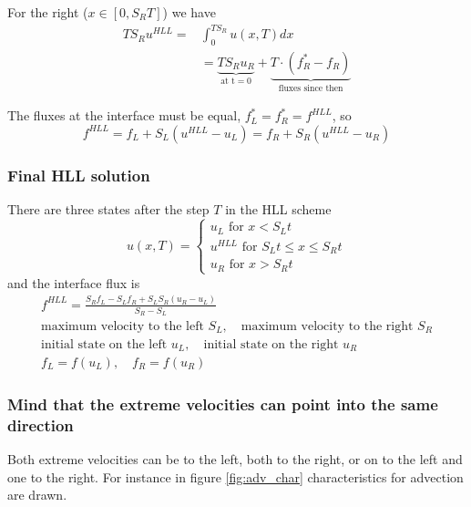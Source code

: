 For the right ($x \in [0, S_R T]$) we have
\begin{equation}
    \begin{aligned}
        T S_R u^{H L L}= & \int_{0}^{T S_R} u(x, T) d x \\
        & = \underbrace{T S_R u_R}_{\text{at t} = 0} + \underbrace{T \cdot\left(f_R^*-f_R\right)}_{\text{fluxes since then}}
    \end{aligned}
\end{equation}

The fluxes at the interface must be equal, $f_L^* = f_R^* = f^{HLL}$, so
\begin{equation}
    f^{H L L}=f_L+S_L\left(u^{H L L}-u_L\right)=f_R+S_R\left(u^{H L L}-u_R\right)
\end{equation}

\subsubsection{Final HLL solution}
There are three states after the step $T$ in the HLL scheme
\begin{equation}
    u(x, T)=\left\{\begin{array}{c}
    u_L \text { for } x<S_L t \\
    u^{H L L} \text { for } S_L t \leq x \leq S_R t \\
    u_R \text { for } x>S_R t
    \end{array}\right.
\end{equation}
and the interface flux is
\begin{equation}
    \begin{gathered}
        f^{H L L}=\frac{S_R f_L-S_L f_R+S_L S_R\left(u_R-u_L\right)}{S_R-S_L} \\
        \text{maximum velocity to the left } S_L, \quad \text{maximum velocity to the right } S_R \\
        \text{initial state on the left } u_L, \quad \text{initial state on the right } u_R \\
        f_L = f(u_L), \quad f_R = f(u_R)
    \end{gathered}
\end{equation}

\subsubsection{Mind that the extreme velocities can point into the same direction}
Both extreme velocities can be to the left, both to the right, or on to the left and one to the right.
For instance in figure \ref{fig:adv_char} characteristics for advection are drawn.

